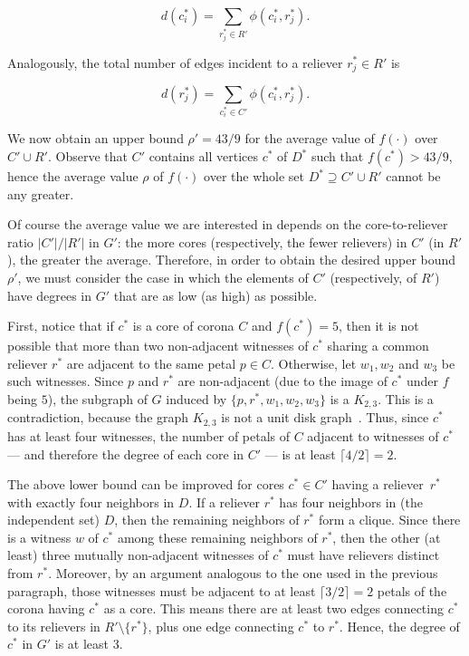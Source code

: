 \documentclass[preprint,12pt]{elsarticle}
\begin{document}
\begin{pf}
$$d(c^*_i) = \sum_{r^*_j \in R'} \phi(c^*_i, r^*_j).$$

Analogously,
the total number of edges incident to a reliever $r^*_j \in R'$ is

$$d(r^*_j) = \sum_{c^*_i \in C'} \phi(c^*_i, r^*_j).$$

We now obtain an upper bound $\rho' = 43/9$ for the average value of $f(\cdot)$ \linebreak over $C' \cup R'$. Observe that $C'$ contains all vertices $c^*$ of $D^*$ such \linebreak that $f(c^*) > 43/9$, hence the average value $\rho$ of $f(\cdot)$ over the whole set $D^* \supseteq C' \cup R'$ cannot be any greater.

Of course the average value we are interested in depends on the core-to-reliever ratio $|C'| / |R'|$ in $G'$: the more cores (respectively, the fewer relievers) in $C'$ (in $R'$), the greater the average. Therefore, in order to obtain the desired upper bound $\rho'$, we must consider the case in which the elements of $C'$ (respectively, of $R'$) have degrees in $G'$ that are as low (as high) as possible.

First, notice that if $c^*$ is a core of corona $C$ and $f(c^*) = 5$, then it is not possible that more than two non-adjacent witnesses of $c^*$ sharing a common reliever $r^*$ are adjacent to the same petal $p \in C$. Otherwise, let $w_1, w_2$ and $w_3$ be such witnesses. Since $p$ and $r^*$ are non-adjacent (due to the image of $c^*$ under $f$ being $5$), the subgraph of $G$ induced by $\{p, r^*,w_1,w_2,w_3\}$ is a $K_{2,3}$. This is a contradiction, because the graph $K_{2,3}$ is not a unit disk graph~\cite{vanLeeuwen}. Thus, since $c^*$ has at least four witnesses, the number of petals of $C$ adjacent to witnesses of $c^*$ --- and therefore the degree of each core in $C'$ --- is at least $\lceil 4/2 \rceil= 2$. 

The above lower bound can be improved for cores $c^* \in C'$ having a \mbox{reliever $r^*$} with exactly four neighbors in $D$. If a reliever $r^*$ has four neighbors in (the independent set) $D$, then the remaining neighbors of $r^*$ form a clique. Since there is a witness $w$ of $c^*$ among these remaining neighbors of $r^*$, then the other (at least) three mutually non-adjacent witnesses of $c^*$ must have relievers distinct from $r^*$. Moreover, by an argument analogous to the one used in the previous paragraph, those witnesses must be adjacent to at least $\lceil 3/2 \rceil= 2$ petals of the corona having $c^*$ as a core. This means there are at least two edges connecting $c^*$ to its relievers in $R' \setminus \{r^*\}$, plus one edge connecting $c^*$ to $r^*$. Hence, the degree \linebreak of $c^*$ in $G'$ is at least $3$.


\end{pf}
\end{document}

